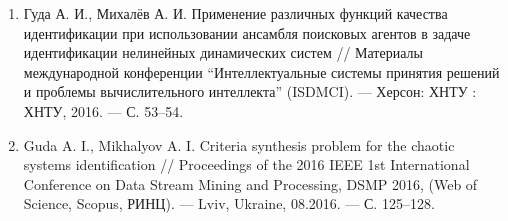 \begin{enumerate}
\item
Гуда А. И., Михалёв А. И. Применение различных функций качества идентификации
при использовании ансамбля поисковых агентов в задаче идентификации нелинейных
динамических систем // Материалы международной конференции
``Интеллектуальные системы принятия решений и проблемы вычислительного интеллекта''
(ISDMCI). --- Херсон: ХНТУ : ХНТУ, 2016. --- С. 53--54.

\item
Guda A. I., Mikhalyov A. I. Criteria synthesis problem for the chaotic systems identification //
Proceedings of the 2016 IEEE 1st International Conference on Data Stream Mining and
Processing, DSMP 2016, (Web of Science, Scopus, РИНЦ). --- Lviv, Ukraine, 08.2016. ---
С. 125--128.

\end{enumerate}

